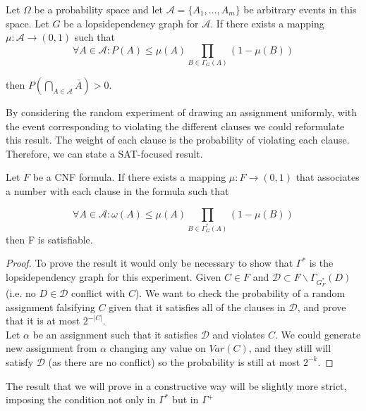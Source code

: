 \begin{theorem}\label{LLL}
	Let $\Omega$ be a probability space and let 
$\mathcal{A} = \{A_1,...,A_m\}$ be arbitrary events in this space. Let $G$ be a lopsidependency graph for $\mathcal{A}$. If there exists a mapping $\mu:\mathcal{A} \to (0,1)$ such that 
$$
\forall A \in \mathcal{A} : P (A) \le \mu(A) \prod_{B\in\Gamma_G(A)} (1-\mu(B))
$$

then $P\left ( \bigcap_{A\in \mathcal{A}} \overline{A}\right ) > 0$.\\
\end{theorem}

By considering the random experiment of drawing an assignment uniformly, with the event corresponding to violating the different clauses we could reformulate this result. The weight of each clause is the probability of violating each clause. Therefore, we can state a SAT-focused result.

\begin{corollary}\label{LLLS}
	Let $F$ be a CNF formula. If there exists a mapping $\mu:F\to (0,1)$ that associates a number with each clause in the formula such that 
	
	$$
\forall A \in \mathcal{A} : \omega (A) \le \mu(A) \prod_{B\in\Gamma^*_G(A)} (1-\mu(B))
$$
	then F is satisfiable.
\end{corollary}
\begin{proof}
	To prove the result it would only be necessary to show  that $ \Gamma^*$ is the lopsidependency graph for this experiment. Given $C \in F$ and $\mathcal{D}\subset F\backslash \Gamma_{G_F^*}(D)\ $(i.e. no $D \in  \mathcal{D}$ conflict with $C$). We want to check the probability of a random assignment falsifying $C$ given that it satisfies all of the clauses in $\mathcal{D}$, and prove that it is at most $2^{-|C|}$. \\ 
	
Let $\alpha$ be an assignment such that it satisfies $\mathcal{D}$ and violates $C$. We could generate new assignment from $\alpha$ changing any value on $Var(C)$, and they still will satisfy $\mathcal{D}$ (as there are no conflict) so the probability is still at most $2^{-k}$. 


\end{proof}


The result that we will prove in a constructive way will be slightly more strict, imposing the condition not only in $\Gamma^*$ but in $\Gamma^+$ 


